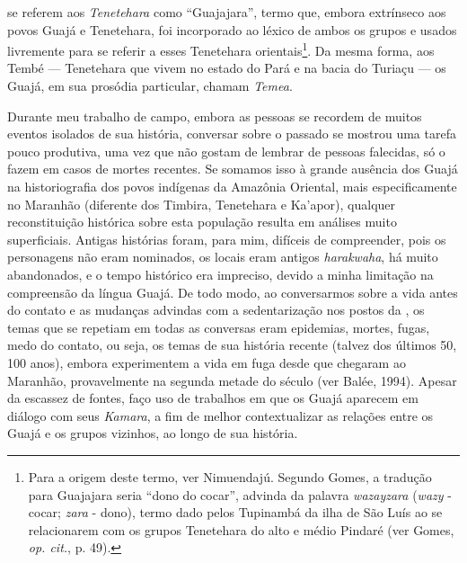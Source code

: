 se referem aos \emph{Tenetehara} como ``Guajajara'', termo que, embora
extrínseco aos povos Guajá e Tenetehara, foi incorporado ao léxico de
ambos os grupos e usados livremente para se referir a esses Tenetehara
orientais\footnote{Para a origem deste termo, ver Nimuendajú. Segundo
  Gomes, a tradução para Guajajara seria ``dono do cocar'', advinda da
  palavra \emph{wazayzara} (\emph{wazy} - cocar; \emph{zara} - dono),
  termo dado pelos Tupinambá da ilha de São Luís ao se relacionarem com
  os grupos Tenetehara do alto e médio Pindaré (ver Gomes, \emph{op. cit.}, p. 49).}. Da mesma forma, aos Tembé --- Tenetehara que vivem no estado do
Pará e na bacia do Turiaçu --- os Guajá, em sua prosódia particular,
chamam \emph{Temea}.

Durante meu trabalho de campo, embora as pessoas se recordem de muitos
eventos isolados de sua história, conversar sobre o passado se mostrou
uma tarefa pouco produtiva, uma vez que não gostam de lembrar de pessoas
falecidas, só o fazem em casos de mortes recentes. Se somamos isso à
grande ausência dos Guajá na historiografia dos povos indígenas da
Amazônia Oriental, mais especificamente no Maranhão (diferente dos
Timbira, Tenetehara e Ka'apor), qualquer reconstituição histórica sobre
esta população resulta em análises muito superficiais. Antigas histórias
foram, para mim, difíceis de compreender, pois os personagens não eram
nominados, os locais eram antigos \emph{harakwaha}, há muito
abandonados, e o tempo histórico era impreciso, devido a minha limitação
na compreensão da língua Guajá. De todo modo, ao conversarmos sobre a
vida antes do contato e as mudanças advindas com a sedentarização nos
postos da , os temas que se repetiam em todas as conversas eram
epidemias, mortes, fugas, medo do contato, ou seja, os temas de sua
história recente (talvez dos últimos 50, 100 anos), embora experimentem
a vida em fuga desde que chegaram ao Maranhão, provavelmente na segunda
metade do século  (ver Balée, 1994). Apesar da escassez de fontes,
faço uso de trabalhos em que os Guajá aparecem em diálogo com seus
\emph{Kamara}, a fim de melhor contextualizar as relações entre os Guajá
e os grupos vizinhos, ao longo de sua história.

